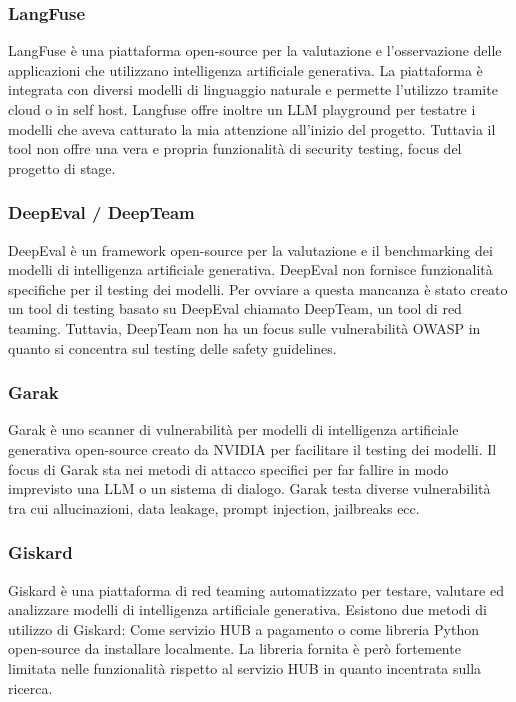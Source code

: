 \subsubsection*{LangFuse}
LangFuse è una piattaforma open-source per la valutazione e l'osservazione delle applicazioni che utilizzano intelligenza artificiale generativa. La piattaforma è integrata con diversi modelli di linguaggio naturale e permette l'utilizzo tramite cloud o in self host. Langfuse offre inoltre un LLM playground per testatre i modelli che aveva catturato la mia attenzione all'inizio del progetto. Tuttavia il tool non offre una vera e propria funzionalità di security testing, focus del progetto di stage.

\subsubsection*{DeepEval / DeepTeam}
DeepEval è un framework open-source per la valutazione e il benchmarking dei modelli di intelligenza artificiale generativa. DeepEval non fornisce funzionalità specifiche per il testing dei modelli. Per ovviare a questa mancanza è stato creato un tool di testing basato su DeepEval chiamato DeepTeam, un tool di red teaming. Tuttavia, DeepTeam non ha un focus sulle vulnerabilità OWASP in quanto si concentra sul testing delle safety guidelines.

\subsubsection*{Garak}
Garak è uno scanner di vulnerabilità per modelli di intelligenza artificiale generativa open-source creato da NVIDIA per facilitare il testing dei modelli. Il focus di Garak sta nei metodi di attacco specifici per far fallire in modo imprevisto una LLM o un sistema di dialogo. Garak testa diverse vulnerabilità tra cui allucinazioni, data leakage, prompt injection, jailbreaks ecc.

\subsubsection*{Giskard}
Giskard è una piattaforma di red teaming automatizzato per testare, valutare ed analizzare modelli di intelligenza artificiale generativa. Esistono due metodi di utilizzo di Giskard: Come servizio HUB a pagamento o come libreria Python open-source da installare localmente. La libreria fornita è però fortemente limitata nelle funzionalità rispetto al servizio HUB in quanto incentrata sulla ricerca.


